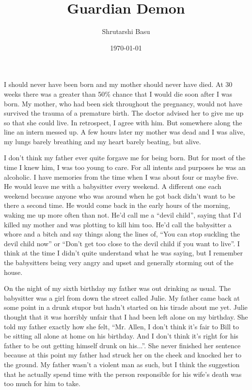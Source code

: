 \documentclass[11pt,letterpaper]{article}
\title{Guardian Demon}
\author{Shrutarshi Basu}
\date{\today}
\begin{document}
\maketitle
\doublespacing

I should never have been born and my mother should never have died. At 30 weeks there was a greater than 50\% chance that I would die soon after I was born. My mother, who had been sick throughout the pregnancy, would not have survived the trauma of a premature birth. The doctor advised her to give me up so that she could live. In retrospect, I agree with him. But somewhere along the line an intern messed up. A few hours later my mother was dead and I was alive, my lungs barely breathing and my heart barely beating, but alive.

I don't think my father ever quite forgave me for being born. But for most of the time I knew him, I was too young to care. For all intents and purposes he was an alcoholic. I have memories from the time when I was about four or maybe five. He would leave me with a babysitter every weekend. A different one each weekend because anyone who was around when he got back didn't want to be there a second time. He would come back in the early hours of the morning, waking me up more often than not. He'd call me a ``devil child'', saying that I'd killed my mother and was plotting to kill him too. He'd call the babysitter a whore and a bitch and say things along the lines of, ``You can stop suckling the devil child now'' or ``Don't get too close to the devil child if you want to live''. I think at the time I didn't quite understand what he was saying, but I remember the babysitters being very angry and upset and generally storming out of the house.

On the night of my sixth birthday my father was out drinking as usual. The babysitter was a girl from down the street called Julie. My father came back at some point in a drunk stupor but hadn't started on his tirade about me yet. Julie thought that it was horribly unfair that I had been left alone on my birthday. She told my father exactly how she felt, ``Mr. Allen, I don't think it's fair to Bill to be sitting all alone at home on his birthday. And I don't think it's right for his father to be out getting himself drunk on his...''. She never finished her sentence because at this point my father had struck her on the cheek and knocked her to the ground. My father wasn't a violent man as such, but I think the suggestion that he actually spend time with the person responsible for his wife's death was too much for him to take.
\end{document}
